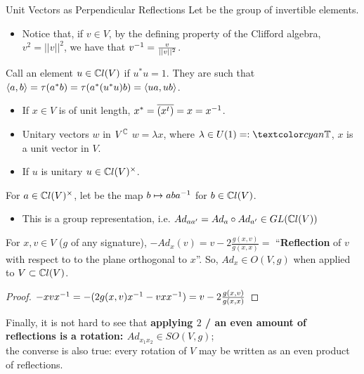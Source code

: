 \begin{frame}{Unit Vectors as Perpendicular Reflections} %
    Let  be the group of invertible elements.
        \begin{itemize}
            
        \item Notice that, if $v \in V$, by the defining property of the Clifford algebra, $v^2 = ||v||^2$, we have that $v^{-1} = \frac{v}{||v||^2}$.
            
        \end{itemize}
    
    Call an element $u \in \mathbb C l(V)$  if $u^* u = 1$. They are such that $\langle a, b \rangle = \tau(a^* b) = \tau(a^*(u^* u) b)  = \langle ua, ub \rangle$.
        \begin{itemize}
            
        \item If $x \in V$ is of unit length,  $x^* = \overline{(x^t)} = x = x^
        {-1}$.
        
        \item Unitary vectors $w$ in $V^\mathbb C$ \Iff $w = \lambda x$, where $\lambda \in U(1) =: \defn{\TT}$, $x$ is a unit vector in $V$.
        
        \item If $u$ is unitary \then $u \in \mathbb C l(V)^\times$.
            
        \end{itemize}
    

\end{frame}

\begin{frame} %

    For $a \in \mathbb C l(V)^\times$, let  be the map $b \mapsto a b a^{-1}$ for $b \in \mathbb C l(V)$. 
        \begin{itemize}
            
        \item This is a group representation, i.e. $Ad_{aa'} = Ad_a \circ Ad_{a'} \in GL(\mathbb C l(V))$ 
            
        \end{itemize}

    \begin{lemma}
    For $x, v \in V$ ($g$ of any signature), $-Ad_x(v) = v - 2 \frac{g(x, v)}{g(x, x)} = $ ``\textbf{Reflection} of $v$ with respect to to the plane orthogonal to $x$''. So, $Ad_x \in O(V, g)$ when applied to $V\subset \mathbb C l(V)$.
    \end{lemma}
    \begin{proof} $-xvx^{-1} = -(2g(x, v)x^{-1} - v x x^{-1}) = v - 2 \frac{g(x, v)}{g(x, x)}$
    \end{proof}
    
    Finally, it is not hard to see that \textbf{applying $2$ / an even amount of reflections is a rotation: $Ad_{x_1 x_2}\in SO(V, g)$}; \\the converse is also true: every rotation of $V$ may be written as an even product of reflections.
    
\end{frame}

